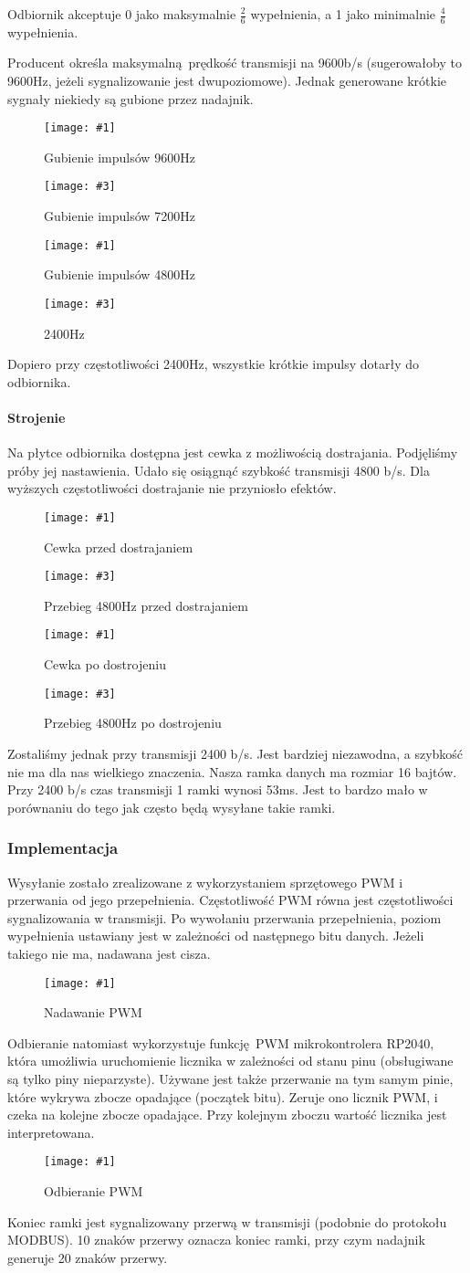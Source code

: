 \documentclass[12pt]{article}
\newcommand{\imgcustomsize}[3]{
	\begin{figure}[H]
		\centering
		\texttt{[image: \#1]}
		\caption{#2}
	\end{figure}
}
\newcommand{\imgsidebyside}[4]{
	\begin{figure}[H]
		\centering
		\begin{minipage}{.45\textwidth}
			\centering
			\texttt{[image: \#1]}
			\caption{#2}
		\end{minipage}%
		\hfill
		\begin{minipage}{.45\textwidth}
			\centering
			\texttt{[image: \#3]}
			\caption{#4}
		\end{minipage}
	\end{figure}
}
\begin{document}
			Odbiornik akceptuje 0 jako maksymalnie $\frac{2}{6}$ wypełnienia, a 1 jako minimalnie $\frac{4}{6}$ wypełnienia.

			Producent określa maksymalną prędkość transmisji na 9600b/s (sugerowałoby to 9600Hz, jeżeli sygnalizowanie jest dwupoziomowe). Jednak generowane krótkie sygnały niekiedy są gubione przez nadajnik.

			\imgsidebyside{bauds/9600}{Gubienie impulsów 9600Hz}{bauds/7200_2}{Gubienie impulsów 7200Hz}
			\imgsidebyside{bauds/4800_2}{Gubienie impulsów 4800Hz}{bauds/2400_2}{2400Hz}

			Dopiero przy częstotliwości 2400Hz, wszystkie krótkie impulsy dotarły do odbiornika.

			\paragraph{Strojenie}
			Na płytce odbiornika dostępna jest cewka z możliwością dostrajania. Podjęliśmy próby jej nastawienia. Udało się osiągnąć szybkość transmisji 4800 b/s. Dla wyższych częstotliwości dostrajanie nie przyniosło efektów.
			\imgsidebyside{bauds/tuning/ph_before}{Cewka przed dostrajaniem}{bauds/tuning/4800_before}{Przebieg 4800Hz przed dostrajaniem}
			\imgsidebyside{bauds/tuning/ph_after}{Cewka po dostrojeniu}{bauds/tuning/4800_after}{Przebieg 4800Hz po dostrojeniu}

			Zostaliśmy jednak przy transmisji 2400 b/s. Jest bardziej niezawodna, a szybkość nie ma dla nas wielkiego znaczenia. Nasza ramka danych ma rozmiar 16 bajtów. Przy 2400 b/s czas transmisji 1 ramki wynosi 53ms. Jest to bardzo mało w porównaniu do tego jak często będą wysyłane takie ramki.

			\subsubsection{Implementacja}
				Wysyłanie zostało zrealizowane z wykorzystaniem sprzętowego PWM i przerwania od jego przepełnienia. Częstotliwość PWM równa jest częstotliwości sygnalizowania w transmisji. Po wywołaniu przerwania przepełnienia, poziom wypełnienia ustawiany jest w zależności od następnego bitu danych. Jeżeli takiego nie ma, nadawana jest cisza.
				\imgcustomsize{pgm/pwm_tx}{Nadawanie PWM}{0.6}

				Odbieranie natomiast wykorzystuje funkcję PWM mikrokontrolera RP2040, która umożliwia uruchomienie licznika w zależności od stanu pinu (obsługiwane są tylko piny nieparzyste). Używane jest także przerwanie na tym samym pinie, które wykrywa zbocze opadające (początek bitu). Zeruje ono licznik PWM, i czeka na kolejne zbocze opadające. Przy kolejnym zboczu wartość licznika jest interpretowana.
				\imgcustomsize{pgm/pwm_rx}{Odbieranie PWM}{0.6}
	 			Koniec ramki jest sygnalizowany przerwą w transmisji (podobnie do protokołu MODBUS). 10 znaków przerwy oznacza koniec ramki, przy czym nadajnik generuje 20 znaków przerwy.
\end{document}
